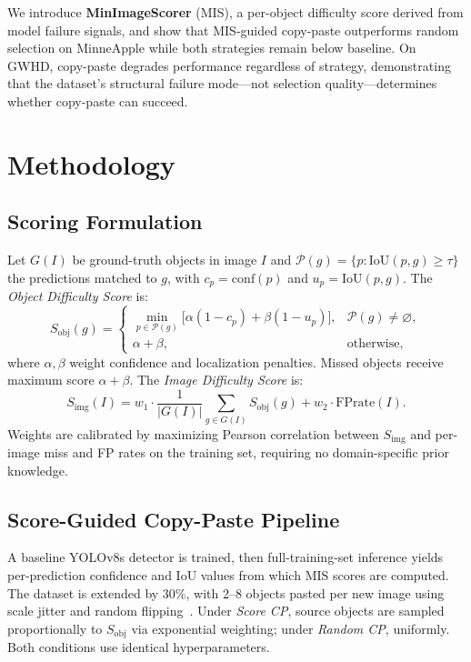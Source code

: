 \documentclass[conference]{IEEEtran}
\begin{document}
We introduce \textbf{MinImageScorer} (MIS), a per-object difficulty
score derived from model failure signals, and show that MIS-guided
copy-paste outperforms random selection on MinneApple while both
strategies remain below baseline. On GWHD, copy-paste degrades
performance regardless of strategy, demonstrating that the dataset's
structural failure mode---not selection quality---determines whether
copy-paste can succeed.

\section{Methodology}

\subsection{Scoring Formulation}

Let $G(I)$ be ground-truth objects in image $I$ and
$\mathcal{P}(g){=}\{p:\mathrm{IoU}(p,g)\ge\tau\}$ the predictions
matched to $g$, with $c_p{=}\mathrm{conf}(p)$ and
$u_p{=}\mathrm{IoU}(p,g)$. The \emph{Object Difficulty Score} is:
%
\begin{equation}
S_{\mathrm{obj}}(g)\!=\!
\begin{cases}
  \min_{p\in\mathcal{P}(g)}\!\bigl[\alpha(1{-}c_p){+}\beta(1{-}u_p)\bigr],
    & \mathcal{P}(g)\neq\varnothing,\\[2pt]
  \alpha{+}\beta, & \text{otherwise,}
\end{cases}
\label{eq:obj}
\end{equation}
%
where $\alpha,\beta$ weight confidence and localization penalties.
Missed objects receive maximum score $\alpha{+}\beta$.
The \emph{Image Difficulty Score} is:
%
\begin{equation}
S_{\mathrm{img}}(I)
  =w_1\!\cdot\!\frac{1}{|G(I)|}\!\sum_{g\in G(I)}\!S_{\mathrm{obj}}(g)
  +w_2\!\cdot\!\mathrm{FPrate}(I).
\label{eq:img}
\end{equation}
%
Weights are calibrated by maximizing Pearson correlation between
$S_{\mathrm{img}}$ and per-image miss and FP rates on the training
set, requiring no domain-specific prior knowledge.

\subsection{Score-Guided Copy-Paste Pipeline}

A baseline YOLOv8s detector is trained, then full-training-set
inference yields per-prediction confidence and IoU values from which
MIS scores are computed. The dataset is extended by 30\%, with 2--8
objects pasted per new image using scale jitter and random
flipping~\cite{ghiasi2021simple}. Under \emph{Score CP}, source
objects are sampled proportionally to $S_{\mathrm{obj}}$ via
exponential weighting; under \emph{Random CP}, uniformly.
Both conditions use identical hyperparameters.
\end{document}
